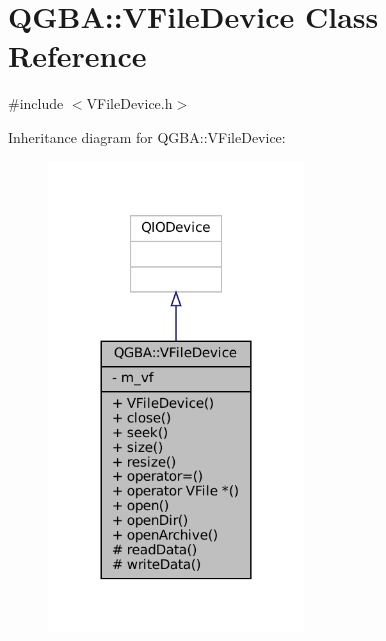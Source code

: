 \hypertarget{class_q_g_b_a_1_1_v_file_device}{}\section{Q\+G\+BA\+:\+:V\+File\+Device Class Reference}
\label{class_q_g_b_a_1_1_v_file_device}


{\ttfamily \#include $<$V\+File\+Device.\+h$>$}



Inheritance diagram for Q\+G\+BA\+:\+:V\+File\+Device\+:
\nopagebreak
\begin{figure}[H]
\begin{center}
\leavevmode
\includegraphics[width=192pt]{class_q_g_b_a_1_1_v_file_device__inherit__graph}
\end{center}
\end{figure}


